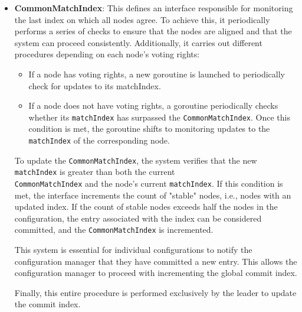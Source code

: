 \begin{itemize}
  \item \textbf{CommonMatchIndex}: This defines an interface responsible for monitoring
    the last index on which all nodes agree. To achieve this, it periodically performs 
    a series of checks to ensure that the nodes are aligned and that the system can 
    proceed consistently. Additionally, it carries out different procedures depending 
    on each node's voting rights:
    \begin{itemize}
      \item If a node has voting rights, a new goroutine is launched to periodically 
        check for updates to its matchIndex.
      \item If a node does not have voting rights, a goroutine periodically checks 
        whether its \texttt{matchIndex} has surpassed the \texttt{CommonMatchIndex}. Once this condition
        is met, the goroutine shifts to monitoring updates to the \texttt{matchIndex} of the corresponding node.
    \end{itemize}
    To update the \texttt{CommonMatchIndex}, the system verifies that the new \texttt{matchIndex} is 
    greater than both the current\\ \texttt{CommonMatchIndex} and the node's current \texttt{matchIndex}. If 
    this condition is met, the interface increments the count of "stable" nodes, i.e., 
    nodes with an updated index. 
    If the count of stable nodes exceeds half the nodes in the configuration, the entry
    associated with the index can be considered committed, and the \texttt{CommonMatchIndex} is incremented.

    This system is essential for individual configurations to notify the configuration 
    manager that they have committed a new entry. This allows the configuration manager 
    to proceed with incrementing the global commit index. 

    Finally, this entire procedure is performed exclusively by the leader to update the commit index.
\end{itemize}

